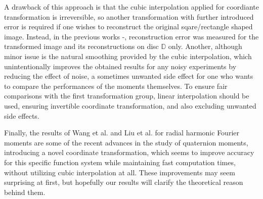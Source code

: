 \documentclass[12pt]{article}
\newcommand{\D}{\mathbb{D}}
\begin{document}
A drawback of this approach is that the cubic interpolation applied for coordiante transformation is irreversible, so another transformation with further introduced error is required if one wishes to reconstruct the original sqare/rectangle shaped image. Instead, in the previous works \cite{LiaoPawlak}-\cite{HosnyChebyshev}, reconstruction error was measured for the transformed image and its reconstructions on disc $\D$ only. Another, although minor issue is the natural smoothing provided by the cubic interpolation, which unintentionally improves the obtained results for any noisy experiments by reducing the effect of noise, a sometimes unwanted side effect for one who wants to compare the performances of the moments themselves. To ensure fair comparisons with the first transformation group, linear interpolation should be used, ensuring invertible coordinate transformation, and also excluding unwanted side effects.

Finally, the results of Wang et al. \cite{WangAcc} and Liu et al. \cite{LiuAcc} for radial harmonic Fourier moments are some of the recent advances in the study of quaternion moments, introducing a novel coordinate transformation, which seems to improve accuracy for this specific function system while maintaining fast computation times, without utilizing cubic interpolation at all. These improvements may seem surprising at first, but hopefully our results will clarify the theoretical reason behind them.
\end{document}
